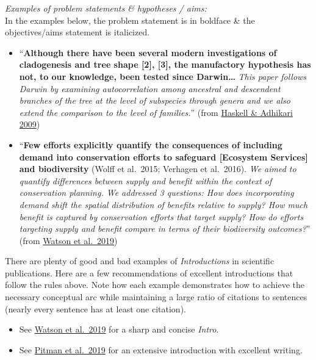 \documentclass[
]{book}
\begin{document}
\emph{Examples of problem statements \& hypotheses / aims:}\\
In the examples below, the problem statement is in boldface \& the objectives/aims statement is italicized.

\begin{itemize}
\item
  ``\textbf{Although there have been several modern investigations of cladogenesis and tree shape {[}2{]}, {[}3{]}, the manufactory hypothesis has not, to our knowledge, been tested since Darwin\ldots{}} \emph{This paper follows Darwin by examining autocorrelation among ancestral and descendent branches of the tree at the level of subspecies through genera and we also extend the comparison to the level of families.}'' (from \href{https://journals.plos.org/plosone/article?id=10.1371/journal.pone.0005460}{Haskell \& Adhikari 2009})
\item
  ``\textbf{Few efforts explicitly quantify the consequences of including demand into conservation efforts to safeguard {[}Ecosystem Services{]} and biodiversity} (Wolff et al.~2015; Verhagen et al.~2016). \emph{We aimed to quantify differences between supply and benefit within the context of conservation planning. We addressed 3 questions: How does incorporating demand shift the spatial distribution of benefits relative to supply? How much benefit is captured by conservation efforts that target supply? How do efforts targeting supply and benefit compare in terms of their biodiversity outcomes?}'' (from \href{https://conbio.onlinelibrary.wiley.com/doi/full/10.1111/cobi.13276}{Watson et al.~2019})
\end{itemize}

There are plenty of good and bad examples of \emph{Introductions} in scientific publications. Here are a few recommendations of excellent introductions that follow the rules above. Note how each example demonstrates how to achieve the necessary conceptual arc while maintaining a large ratio of citations to sentences (nearly every sentence has at least one citation).

\begin{itemize}
\item
  See \href{https://conbio.onlinelibrary.wiley.com/doi/full/10.1111/cobi.13276}{Watson et al.~2019} for a sharp and concise \emph{Intro}.
\item
  See \href{https://onlinelibrary.wiley.com/doi/full/10.1111/mms.12661}{Pitman et al.~2019} for an extensive introduction with excellent writing.
\end{itemize}
\end{document}
